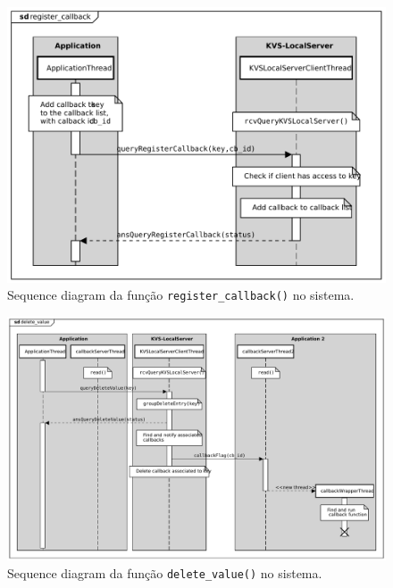\begin{figure}[H]
    \centering
    \includegraphics[width=0.8\linewidth]{figures/UML/register_callback.pdf}
    \caption{Sequence diagram da função \texttt{register\_callback()} no sistema.}
    \label{fig:sd_register_callback}
\end{figure}

\begin{figure}[H]
    \centering
    \includegraphics[width=\linewidth]{figures/UML/delete_value.pdf}
    \caption{Sequence diagram da função \texttt{delete\_value()} no sistema.}
    \label{fig:sd_delete_value}
\end{figure}

